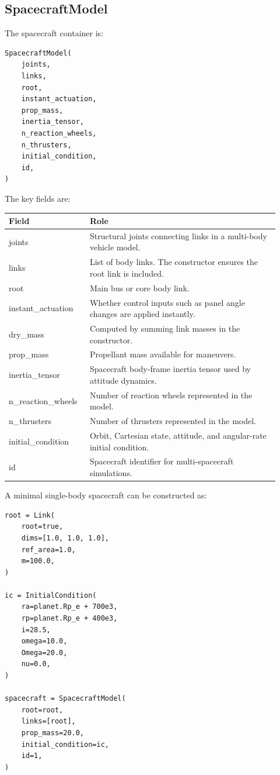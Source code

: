 \documentclass[11pt]{article}
\begin{document}
\subsection{SpacecraftModel}

The spacecraft container is:

\begin{lstlisting}
SpacecraftModel(
    joints,
    links,
    root,
    instant_actuation,
    prop_mass,
    inertia_tensor,
    n_reaction_wheels,
    n_thrusters,
    initial_condition,
    id,
)
\end{lstlisting}

The key fields are:

\begin{longtable}{>{\ttfamily}p{0.26\linewidth}p{0.66\linewidth}}
\textbf{Field} & \textbf{Role} \\
\hline
joints & Structural joints connecting links in a multi-body vehicle model. \\
links & List of body links. The constructor ensures the root link is included. \\
root & Main bus or core body link. \\
instant\_actuation & Whether control inputs such as panel angle changes are applied instantly. \\
dry\_mass & Computed by summing link masses in the constructor. \\
prop\_mass & Propellant mass available for maneuvers. \\
inertia\_tensor & Spacecraft body-frame inertia tensor used by attitude dynamics. \\
n\_reaction\_wheels & Number of reaction wheels represented in the model. \\
n\_thrusters & Number of thrusters represented in the model. \\
initial\_condition & Orbit, Cartesian state, attitude, and angular-rate initial condition. \\
id & Spacecraft identifier for multi-spacecraft simulations. \\
\end{longtable}

A minimal single-body spacecraft can be constructed as:

\begin{lstlisting}
root = Link(
    root=true,
    dims=[1.0, 1.0, 1.0],
    ref_area=1.0,
    m=100.0,
)

ic = InitialCondition(
    ra=planet.Rp_e + 700e3,
    rp=planet.Rp_e + 400e3,
    i=28.5,
    omega=10.0,
    Omega=20.0,
    nu=0.0,
)

spacecraft = SpacecraftModel(
    root=root,
    links=[root],
    prop_mass=20.0,
    initial_condition=ic,
    id=1,
)
\end{lstlisting}
\end{document}
